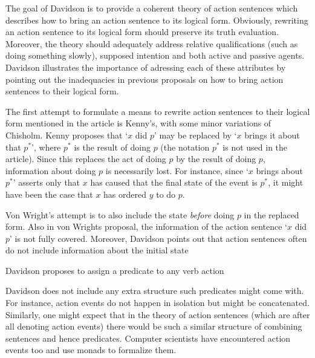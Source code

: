 \documentclass{article}
\begin{document}
\maketitle

The goal of Davidson is to provide a coherent theory of action sentences which
describes how to bring an action sentence to its logical form. Obviously,
rewriting an action sentence to its logical form should preserve its truth
evaluation. Moreover, the theory should adequately address relative 
qualifications (such as doing something slowly), supposed intention and
both active and passive agents. Davidson illustrates the importance of adressing
each of these attributes by pointing out the inadequacies in previous
proposals on how to bring action sentences to their logical form.

The first attempt to formulate a means to rewrite action sentences to their
logical form mentioned in the article is Kenny's, with some minor variations of
Chisholm. Kenny proposes that `$x$ did $p$' may be replaced by
`$x$ brings it about that $p^*$', where $p^*$ is the result of doing $p$ (the
notation $p^*$ is not used in the article). Since this replaces
the act of doing $p$ by the result of doing $p$, information about doing $p$
is necessarily lost. For instance, since `$x$ brings about $p^*$' asserts only 
that $x$ has caused that the final state of the event is $p^*$, it might have
been the case that $x$ has ordered $y$ to do $p$. 

Von Wright's attempt is to also include the state
\emph{before} doing $p$ in the replaced form. Also in von Wrights proposal, the
information of the action sentence `$x$ did $p$' is not fully covered. Moreover,
Davidson points out that action sentences often do not include information
about the initial state

Davidson proposes to assign a predicate to any verb action

Davidson does not include any extra structure such predicates might come with.
For instance, action events do not happen in isolation but might be 
concatenated. Similarly,
one might expect that in the theory of action sentences (which are after all
denoting action events) there would be such a similar structure of combining
sentences and hence predicates. Computer scientists have encountered action 
events too and use monads to formalize them. 
\end{document}

